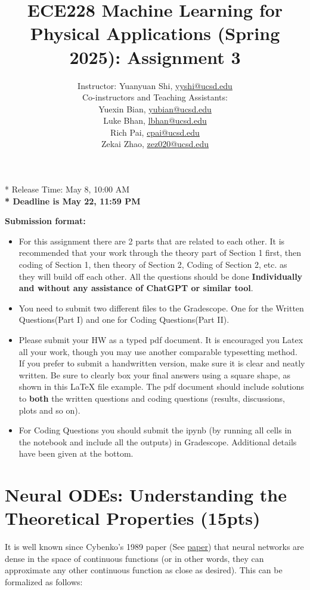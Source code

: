 \documentclass[12pt,letterpaper, onecolumn]{exam}
\title{ECE228 Machine Learning for Physical Applications (Spring 2025): Assignment 3}
\author
{Instructor: Yuanyuan Shi, \url{yyshi@ucsd.edu} \\
Co-instructors and Teaching Assistants:\\
Yuexin Bian, \url{yubian@ucsd.edu}\\
Luke Bhan, \url{lbhan@ucsd.edu}\\
Rich Pai, \url{cpai@ucsd.edu}\\
Zekai Zhao, \url{zez020@ucsd.edu}
}
\date{}
\theoremstyle{definition}
\begin{document}
\maketitle
\begin{center}
{\color{red} * Release Time: May 8, 10:00 AM}\\
\textbf{* Deadline is May 22, 11:59 PM}
\end{center}

\textbf{Submission format:} 
\begin{itemize}
    \item For this assignment there are 2 parts that are related to each other. It is recommended that your work through the theory part of Section 1 first, then coding of Section 1, then theory of Section 2, Coding of Section 2, etc. as they will build off each other. All the questions should be done \textbf{Individually and without any assistance of ChatGPT or similar tool}.
    \item You need to submit two different files to the Gradescope. One for the Written Questions(Part I) and one for Coding Questions(Part II).
    \item Please submit your HW as a typed pdf document. It is encouraged you Latex all your work, though you may use another comparable typesetting method. 
    If you prefer to submit a handwritten version, make sure it is clear and neatly written. Be sure to clearly box your final answers using a square shape, as shown in this LaTeX file example.
    The pdf document should include solutions to \textbf{both} the written questions and coding questions (results, discussions, plots and so on).
    \item For Coding Questions you should submit the ipynb (by running all cells in the notebook and include all the outputs) in Gradescope. Additional details have been given at the bottom.
\end{itemize}

\section{Neural ODEs: Understanding the Theoretical Properties (15pts)}
It is well known since Cybenko's 1989 paper (See \href{https://web.njit.edu/~usman/courses/cs677/10.1.1.441.7873.pdf}{paper}) that neural networks are dense in the space of continuous functions (or in other words, they can approximate any other continuous function as close as desired). This can be formalized as follows:
\end{document}
